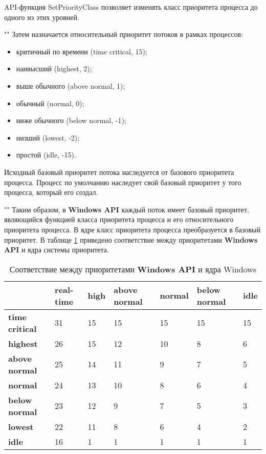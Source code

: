 \noindent API-функция SetPriorityClass позволяет изменять класс приоритета процесса до одного из этих уровней.

""\newline
\noindent Затем назначается относительный приоритет потоков в рамках процессов:

\begin{itemize} 
    \item критичный по времени (time critical, 15);
    \item наивысший (highest, 2);
    \item выше обычного (above normal, 1);
    \item обычный (normal, 0);
    \item ниже обычного (below normal, -1);
    \item низший (lowest, -2);
    \item простой (idle, -15).
\end{itemize} 

\noindent Исходный базовый приоритет потока наследуется от базового приоритета процесса. Процесс по умолчанию наследует свой базовый приоритет у того процесса, который его создал. 

""\newline
\noindent Таким образом, в \textbf{Windows API} каждый поток имеет базовый приоритет, являю­щийся функцией класса приоритета процесса и его относительного приоритета процесса. В  ядре класс приоритета процесса преобразуется в базовый приоритет. В таблице \ref{tbl:priority} приведено соответствие между приоритетами \textbf{Windows API} и ядра системы приоритета.

\begin{table}[h]
    \caption{Соответствие между приоритетами \textbf{Windows API} и ядра Windows}
    \begin{center}
        \begin{tabular}{|l|p{45pt}|p{45pt}|p{45pt}|p{45pt}|p{45pt}|p{45pt}|}
            \hline
            {} & \textbf{real-time} & \textbf{high} & \textbf{above normal} & \textbf{normal} & \textbf{below normal} & \textbf{idle}\\
            \hline
            \textbf{time critical} & 31 & 15 & 15 & 15 & 15 & 15 \\
            \hline
            \textbf{highest} & 26 & 15 & 12 & 10 & 8 & 6 \\
            \hline
            \textbf{above normal} & 25 & 14 & 11 & 9 & 7 & 5 \\
            \hline
            \textbf{normal} & 24 & 13 & 10 & 8 & 6 & 4 \\
            \hline
            \textbf{below normal} & 23 & 12 & 9 & 7 & 5 & 3 \\
            \hline
            \textbf{lowest} & 22 & 11 & 8 & 6 & 4 & 2 \\
            \hline
            \textbf{idle} & 16 & 1 & 1 & 1 & 1 & 1 \\
            \hline
        \end{tabular}
    \end{center}
    \label{tbl:priority}
\end{table}


